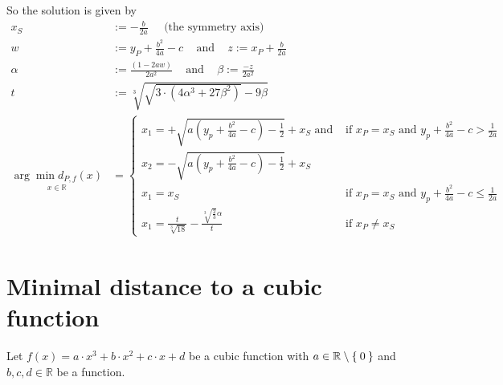 \documentclass[a4paper]{scrartcl}
\theoremstyle{break}
\def\mdr{\ensuremath{\mathbb{R}}}
\theoremstyle{nonumberplain}
\def\mdr{\ensuremath{\mathbb{R}}}
\begin{document}
\goodbreak
So the solution is given by
\begin{align*}
x_S &:= - \frac{b}{2a} \;\;\;\;\; \text{(the symmetry axis)}\\
w &:= y_P+\frac{b^2}{4a}-c \;\;\; \text{ and } \;\;\; z := x_P+\frac{b}{2a}\\
\alpha &:= \frac{(1- 2 aw)}{2 a^2} \;\;\;\text{ and }\;\;\; \beta := \frac{-z}{2 a^2}\\
t &:= \sqrt[3]{\sqrt{3 \cdot (4 \alpha^3 + 27 \beta^2)} -9\beta}\\
\underset{x\in\mdr}{\arg \min d_{P,f}(x)} &= \begin{cases}
     x_1 = +\sqrt{a (y_p + \frac{b^2}{4a} - c) - \frac{1}{2}} + x_S \text{ and }   &\text{if } x_P = x_S \text{ and } y_p + \frac{b^2}{4a} - c >  \frac{1}{2a} \\
     x_2 = -\sqrt{a (y_p + \frac{b^2}{4a} - c) - \frac{1}{2}} + x_S\\
     x_1 = x_S   &\text{if } x_P = x_S \text{ and } y_p + \frac{b^2}{4a} - c \leq  \frac{1}{2a} \\
     x_1 = \frac{t}{\sqrt[3]{18}} - \frac{\sqrt[3]{\frac{2}{3}} \alpha }{t}   &\text{if } x_P \neq x_S
    \end{cases}
\end{align*}

\clearpage
\section{Minimal distance to a cubic function}
Let $f(x) = a \cdot x^3 + b \cdot x^2 + c \cdot x + d$ be a cubic function
with $a \in \mdr \setminus \Set{0}$ and 
$b, c, d \in \mdr$ be a function.
\end{document}
